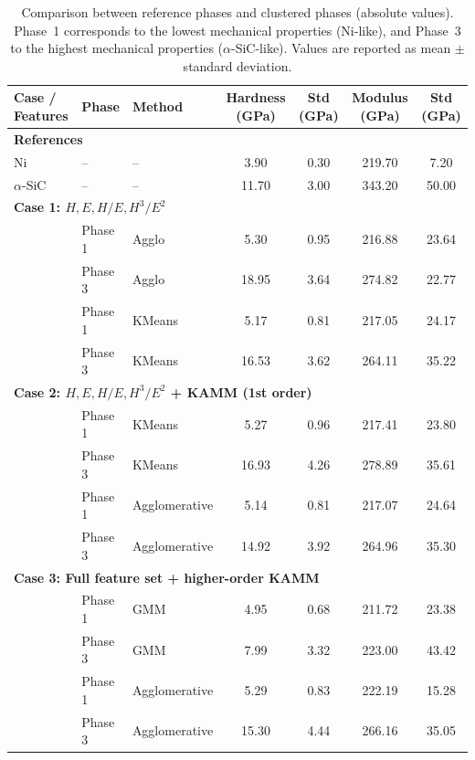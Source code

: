 \documentclass[final,3p,times]{elsarticle}
\begin{document}
\begin{table}[htbp]
\centering
\caption{Comparison between reference phases and clustered phases (absolute values). Phase~1 corresponds to the lowest mechanical properties (Ni-like), and Phase~3 to the highest mechanical properties ($\alpha$-SiC-like). Values are reported as mean $\pm$ standard deviation.}
\label{tab:ref_cluster_feature_comparison}
\begin{tabular}{l l l c c c c}
\hline
\textbf{Case / Features} & \textbf{Phase} & \textbf{Method} &
\textbf{Hardness (GPa)} & \textbf{Std (GPa)} &
\textbf{Modulus (GPa)} & \textbf{Std (GPa)} \\
\hline

\multicolumn{7}{l}{\textbf{References}} \\
Ni \cite{mercier_microstructural_2019}             & -- & -- & 3.90 & 0.30 & 219.70 & 7.20 \\
$\alpha$-SiC \cite{mercier_microstructural_2019}   & -- & -- & 11.70 & 3.00 & 343.20 & 50.00 \\
\hline

\multicolumn{7}{l}{\textbf{Case 1: $H, E, H/E, H^3/E^2$}} \\
& Phase 1 & Agglo  & 5.30 & 0.95 & 216.88 & 23.64 \\
& Phase 3 & Agglo  & 18.95 & 3.64 & 274.82 & 22.77 \\
& Phase 1 & KMeans & 5.17 & 0.81 & 217.05 & 24.17 \\
& Phase 3 & KMeans & 16.53 & 3.62 & 264.11 & 35.22 \\
\hline

\multicolumn{7}{l}{\textbf{Case 2: $H, E, H/E, H^3/E^2$ + KAMM (1st order)}} \\
& Phase 1 & KMeans & 5.27 & 0.96 & 217.41 & 23.80 \\
& Phase 3 & KMeans & 16.93 & 4.26 & 278.89 & 35.61 \\
& Phase 1 & Agglomerative & 5.14 & 0.81 & 217.07 & 24.64 \\
& Phase 3 & Agglomerative & 14.92 & 3.92 & 264.96 & 35.30 \\
\hline

\multicolumn{7}{l}{\textbf{Case 3: Full feature set + higher-order KAMM}} \\
& Phase 1 & GMM    & 4.95 & 0.68 & 211.72 & 23.38 \\
& Phase 3 & GMM    & 7.99 & 3.32 & 223.00 & 43.42 \\
& Phase 1 & Agglomerative & 5.29 & 0.83 & 222.19 & 15.28 \\
& Phase 3 & Agglomerative & 15.30 & 4.44 & 266.16 & 35.05 \\
\hline

\end{tabular}
\end{table}
\end{document}
